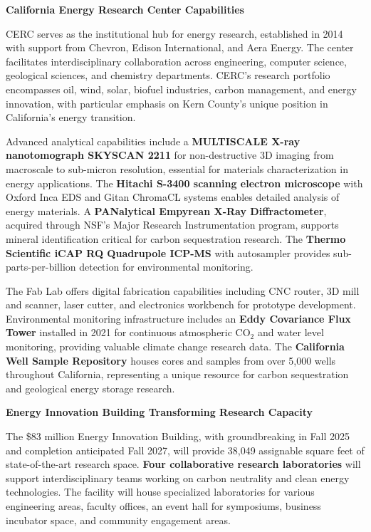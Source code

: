 \documentclass[11pt]{article}
\begin{document}
\textbf{California Energy Research Center Capabilities}

CERC serves as the institutional hub for energy research, established in 2014 with support from Chevron, Edison International, and Aera Energy. The center facilitates interdisciplinary collaboration across engineering, computer science, geological sciences, and chemistry departments. CERC's research portfolio encompasses oil, wind, solar, biofuel industries, carbon management, and energy innovation, with particular emphasis on Kern County's unique position in California's energy transition.

Advanced analytical capabilities include a \textbf{MULTISCALE X-ray nanotomograph SKYSCAN 2211} for non-destructive 3D imaging from macroscale to sub-micron resolution, essential for materials characterization in energy applications. The \textbf{Hitachi S-3400 scanning electron microscope} with Oxford Inca EDS and Gitan ChromaCL systems enables detailed analysis of energy materials. A \textbf{PANalytical Empyrean X-Ray Diffractometer}, acquired through NSF's Major Research Instrumentation program, supports mineral identification critical for carbon sequestration research. The \textbf{Thermo Scientific iCAP RQ Quadrupole ICP-MS} with autosampler provides sub-parts-per-billion detection for environmental monitoring.

The Fab Lab offers digital fabrication capabilities including CNC router, 3D mill and scanner, laser cutter, and electronics workbench for prototype development. Environmental monitoring infrastructure includes an \textbf{Eddy Covariance Flux Tower} installed in 2021 for continuous atmospheric CO$_2$ and water level monitoring, providing valuable climate change research data. The \textbf{California Well Sample Repository} houses cores and samples from over 5,000 wells throughout California, representing a unique resource for carbon sequestration and geological energy storage research.

\textbf{Energy Innovation Building Transforming Research Capacity}

The \$83 million Energy Innovation Building, with groundbreaking in Fall 2025 and completion anticipated Fall 2027, will provide 38,049 assignable square feet of state-of-the-art research space. \textbf{Four collaborative research laboratories} will support interdisciplinary teams working on carbon neutrality and clean energy technologies. The facility will house specialized laboratories for various engineering areas, faculty offices, an event hall for symposiums, business incubator space, and community engagement areas.
\end{document}
